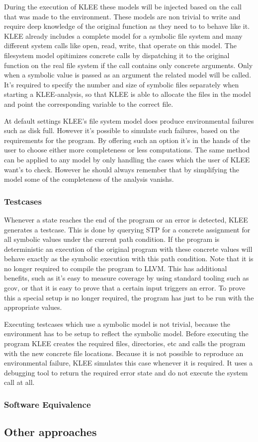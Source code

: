 During the execution of KLEE these models will be injected based on the call that was made to the environment. These models are non trivial to write and require deep knowledge of the original function as they need to to behave like it. KLEE already includes a complete model for a symbolic file system and many different system calls like open, read, write, that operate on this model.
The filesystem model opitimizes concrete calls by dispatching it to the original function on the real file system if the call contains only concrete arguments. Only when a symbolic value is passed as an argument the related model will be called. It's required to specify the number and size of symbolic files separately when starting a KLEE-analysis, so that KLEE is able to allocate the files in the model and point the corresponding variable to the correct file.

At default settings KLEE's file system model does produce environmental failures such as disk full. However it's possible to simulate such failures, based on the requirements for the program. By offering such an option it's in the hands of the user to choose either more completeness or less computations. The same method can be applied to any model by only handling the cases which the user of KLEE want's to check. However he should always remember that by simplifying the model some of the completeness of the analysis vanishs.

\subsubsection{Testcases}
Whenever a state reaches the end of the program or an error is detected, KLEE generates a testcase. This is done by querying STP for a concrete assignment for all symbolic values under the current path condition. If the program is deterministic an execution of the original program with these concrete values will behave exactly as the symbolic execution with this path condition.
Note that it is no longer required to compile the program to LLVM. This has additional benefits, such as it's easy to measure coverage by using standard tooling such as gcov, or that it is easy to prove that a certain input triggers an error. To prove this a special setup is no longer required, the program has just to be run with the appropriate values.

Executing testcases which use a symbolic model is not trivial, because the environment has to be setup to reflect the symbolic model. Before executing the program KLEE creates the required files, directories, etc and calls the program with the new concrete file locations. Because it is not possible to reproduce an environmental failure, KLEE simulates this case whenever it is required. It uses a debugging tool to return the required error state and do not execute the system call at all.

\subsubsection{Software Equivalence}
\subsection{Other approaches}
\cite{SurveySymExec-CSUR18}